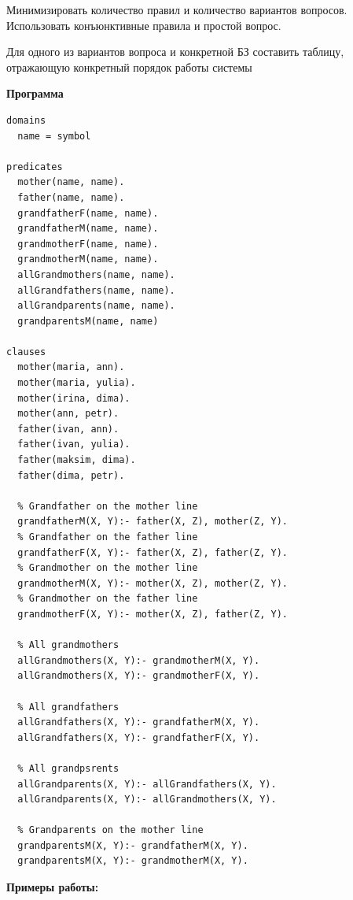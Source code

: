 \documentclass[a4paper,14pt]{extreport} %
\begin{document}
Минимизировать количество правил и количество вариантов вопросов. Использовать конъюнктивные правила и простой вопрос.

Для одного из вариантов вопроса и конкретной БЗ составить таблицу, отражающую конкретный порядок работы системы

\hfill

\textbf{Программа}

\begin{lstlisting}
domains
  name = symbol
        
predicates
  mother(name, name).
  father(name, name).
  grandfatherF(name, name).
  grandfatherM(name, name).
  grandmotherF(name, name).
  grandmotherM(name, name).
  allGrandmothers(name, name).
  allGrandfathers(name, name).
  allGrandparents(name, name).
  grandparentsM(name, name)

clauses
  mother(maria, ann).
  mother(maria, yulia).
  mother(irina, dima).
  mother(ann, petr).
  father(ivan, ann).
  father(ivan, yulia).
  father(maksim, dima).
  father(dima, petr).
  
  % Grandfather on the mother line
  grandfatherM(X, Y):- father(X, Z), mother(Z, Y).
  % Grandfather on the father line
  grandfatherF(X, Y):- father(X, Z), father(Z, Y).
  % Grandmother on the mother line
  grandmotherM(X, Y):- mother(X, Z), mother(Z, Y).
  % Grandmother on the father line
  grandmotherF(X, Y):- mother(X, Z), father(Z, Y).
  
  % All grandmothers
  allGrandmothers(X, Y):- grandmotherM(X, Y).
  allGrandmothers(X, Y):- grandmotherF(X, Y).
  
  % All grandfathers
  allGrandfathers(X, Y):- grandfatherM(X, Y).
  allGrandfathers(X, Y):- grandfatherF(X, Y).
  
  % All grandpsrents
  allGrandparents(X, Y):- allGrandfathers(X, Y).
  allGrandparents(X, Y):- allGrandmothers(X, Y).
  
  % Grandparents on the mother line
  grandparentsM(X, Y):- grandfatherM(X, Y).
  grandparentsM(X, Y):- grandmotherM(X, Y).
\end{lstlisting}

\textbf{Примеры работы:}
\end{document}
